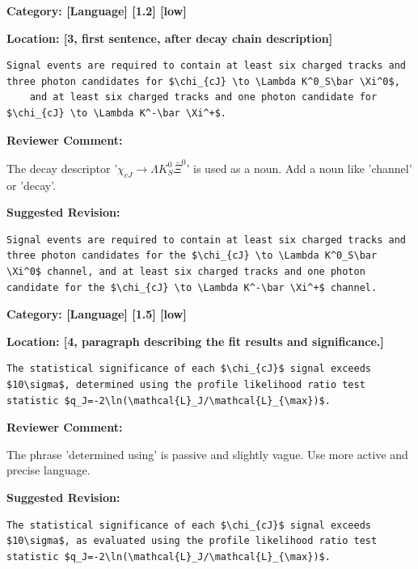 \documentclass[12pt]{article}
\begin{document}
\begin{reviewer}
\noindent \textbf{Category: [Language] [1.2] [low]}

\noindent \textbf{Location: [3, first sentence, after decay chain description]}

\begin{lstlisting}[breaklines=true]
	Signal events are required to contain at least six charged tracks and three photon candidates for $\chi_{cJ} \to \Lambda K^0_S\bar \Xi^0$,
	and at least six charged tracks and one photon candidate for $\chi_{cJ} \to \Lambda K^-\bar \Xi^+$.
\end{lstlisting}

\textbf{Reviewer Comment:}

The decay descriptor '$\chi_{cJ} \to \Lambda K^0_S\bar \Xi^0$' is used as a noun. Add a noun like 'channel' or 'decay'.

\textbf{Suggested Revision:}

\begin{lstlisting}[breaklines=true]
	Signal events are required to contain at least six charged tracks and three photon candidates for the $\chi_{cJ} \to \Lambda K^0_S\bar \Xi^0$ channel, and at least six charged tracks and one photon candidate for the $\chi_{cJ} \to \Lambda K^-\bar \Xi^+$ channel.
\end{lstlisting}

\end{reviewer}

\begin{reviewer}
\noindent \textbf{Category: [Language] [1.5] [low]}

\noindent \textbf{Location: [4, paragraph describing the fit results and significance.]}

\begin{lstlisting}[breaklines=true]
	The statistical significance of each $\chi_{cJ}$ signal exceeds $10\sigma$, determined using the profile likelihood ratio test statistic $q_J=-2\ln(\mathcal{L}_J/\mathcal{L}_{\max})$.
\end{lstlisting}

\textbf{Reviewer Comment:}

The phrase 'determined using' is passive and slightly vague. Use more active and precise language.

\textbf{Suggested Revision:}

\begin{lstlisting}[breaklines=true]
	The statistical significance of each $\chi_{cJ}$ signal exceeds $10\sigma$, as evaluated using the profile likelihood ratio test statistic $q_J=-2\ln(\mathcal{L}_J/\mathcal{L}_{\max})$.
\end{lstlisting}

\end{reviewer}
\end{document}

